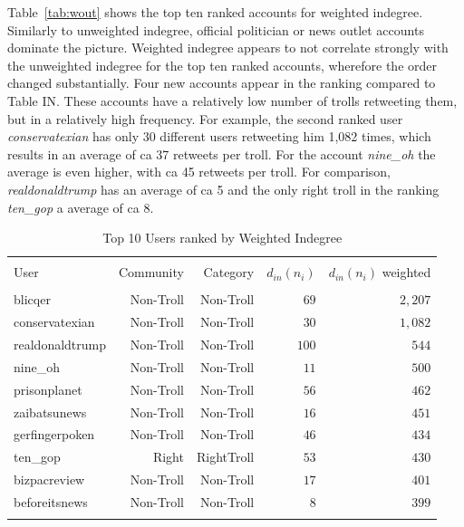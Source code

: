 \documentclass[12pt, titlepage=true, toc=bib]{scrartcl}
\begin{document}
Table~\ref{tab:wout} shows the top ten ranked accounts for weighted indegree. Similarly to unweighted indegree, official politician or news outlet accounts dominate the picture. Weighted indegree appears to not correlate strongly with the unweighted indegree for the top ten ranked accounts, wherefore the order changed substantially. Four new accounts appear in the ranking compared to Table IN. These accounts have a relatively low number of trolls retweeting them, but in a relatively high frequency. For example, the second ranked user \textit{conservatexian} has only 30 different users retweeting him 1,082 times, which results in an average of ca 37 retweets per troll. For the account \textit{nine\_oh} the average is even higher, with ca 45 retweets per troll. For comparison, \textit{realdonaldtrump} has an average of ca 5 and the only right troll in the ranking \textit{ten\_gop} a average of ca 8.

\begin{table}[ht] \centering 
  \begin{tabular*}{.95\linewidth}{@{\extracolsep{\fill}} lrrrr} 
\\[-1.8ex]\hline 
\hline \\[-1.8ex] 
User & Community & Category & \( d_{in}(n_{i}) \) & \( d_{in}(n_{i}) \) weighted \\ 
\hline \\[-1.8ex] 
blicqer & Non-Troll & Non-Troll & $69$ & $2,207$ \\ 
conservatexian & Non-Troll & Non-Troll & $30$ & $1,082$ \\ 
realdonaldtrump & Non-Troll & Non-Troll & $100$ & $544$ \\ 
nine\_oh & Non-Troll & Non-Troll & $11$ & $500$ \\ 
prisonplanet & Non-Troll & Non-Troll & $56$ & $462$ \\ 
zaibatsunews & Non-Troll & Non-Troll & $16$ & $451$ \\ 
gerfingerpoken & Non-Troll & Non-Troll & $46$ & $434$ \\ 
ten\_gop & Right & RightTroll & $53$ & $430$ \\ 
bizpacreview & Non-Troll & Non-Troll & $17$ & $401$ \\ 
beforeitsnews & Non-Troll & Non-Troll & $8$ & $399$ \\ 
\hline \\[-1.8ex] 
\end{tabular*} 
\caption{Top 10 Users ranked by Weighted Indegree} 
  \label{tab:win} 
\end{table}
\end{document}
